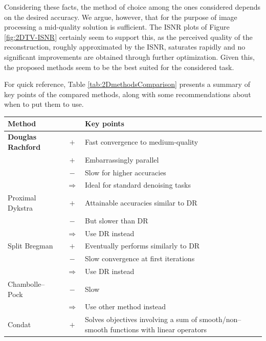\documentclass[twoside,11pt]{article}
\def\abovestrut#1{\rule[0in]{0in}{#1}\ignorespaces}
\def\belowstrut#1{\rule[-#1]{0in}{#1}\ignorespaces}
\def\abovespace{\abovestrut{0.20in}}
\def\belowspace{\belowstrut{0.10in}}
\numberwithin{equation}{section}
\numberwithin{theorem}{section}
\begin{document}
Considering these facts, the method of choice among the ones considered depends on the desired accuracy. We argue, however, that for the purpose of image processing a mid-quality solution is sufficient. The ISNR plots of Figure \ref{fig:2DTV-ISNR} certainly seem to support this, as the perceived quality of the reconstruction, roughly approximated by the ISNR, saturates rapidly and no significant improvements are obtained through further optimization. Given this, the proposed methods seem to be the best suited for the considered task.

For quick reference, Table \ref{tab:2DmethodsComparison} presents a summary of key points of the compared methods, along with some recommendations about when to put them to use.

\begin{table}[tbp]
\centering
\begin{tabular}{lcp{}}
\hline
\abovespace\belowspace
      Method & & Key points \\
\hline
\abovespace
{\bf Douglas Rachford} & \color{red}$+$ & Fast convergence to medium-quality \\
                       & \color{red}$+$ & Embarrassingly parallel \\
                       & \color{blue}$-$ & Slow for higher accuracies \\
                       & $\Rightarrow$ & Ideal for standard denoising tasks \belowspace\\
\hline
\abovespace
Proximal Dykstra & \color{red}$+$ & Attainable accuracies similar to DR \\
                 & \color{blue}$-$ & But slower than DR \\
                 & $\Rightarrow$ & Use DR instead \belowspace\\
\hline
\abovespace
Split Bregman & \color{red}$+$ & Eventually performs similarly to DR \\
              & \color{blue}$-$ & Slow convergence at first iterations \\
              & $\Rightarrow$ & Use DR instead \belowspace\\
\hline
\abovespace
Chambolle--Pock & \color{blue}$-$ & Slow \\
                & $\Rightarrow$ & Use other method instead \belowspace\\
\hline
\abovespace
Condat & \color{red}$+$ & Solves objectives involving a sum of smooth/non--smooth functions with linear operators \\

\end{tabular}
\end{table}
\end{document}
